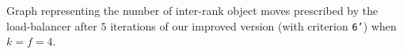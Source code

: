 Graph representing the number of inter-rank object moves prescribed by the load-balancer
after  $5$ iterations of our improved version (with criterion \texttt{6'}) when $k=f=4$.
